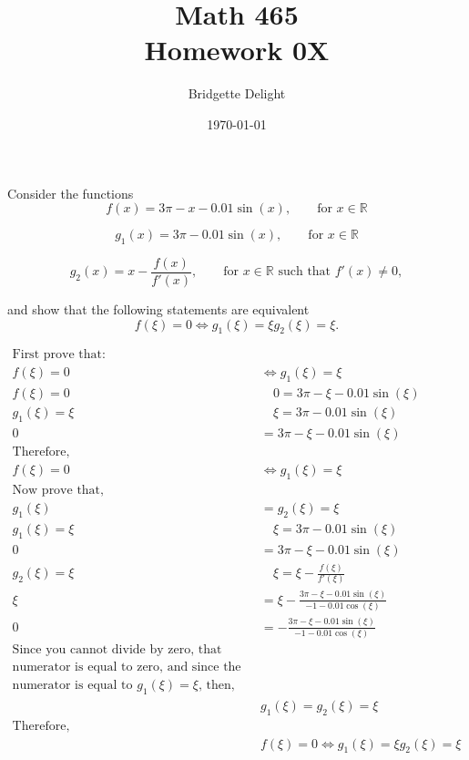 \documentclass{article}
\title{{\large Math 465}\\ Homework 0X}
\author{Bridgette Delight}
\date{\today}
\begin{document}

\section{}
Consider the functions
\begin{equation}\label{eq:1a}
    f(x) = 3\pi - x - 0.01 \sin(x), \qquad \text{for }x \in \mathbb{R}
\end{equation}

\begin{equation}\label{eq:1b}
    g_1(x) = 3\pi - 0.01 \sin(x), \qquad \text{for }x \in \mathbb{R}
\end{equation}

\begin{equation}\label{eq:1c}
    g_2(x) =  x - \frac{f(x)}{f'(x)}, \qquad \text{for }x \in \mathbb{R} \text{ such that }f'(x) \ne 0,
\end{equation}

and show that the following statements are equivalent
$$f(\xi) = 0 \Longleftrightarrow g_1(\xi)=\xi g_2(\xi) = \xi.$$

\vspace{10mm}

\begin{align*}
    \text{First prove that:}&\\
    f(\xi) =0 & \Longleftrightarrow g_1(\xi)=\xi\\
    f(\xi) =0 &\quad 0 = 3\pi - \xi - 0.01\sin(\xi)\\
    g_1(\xi)=\xi & \quad \xi = 3\pi - 0.01\sin(\xi)\\
    0 &= 3\pi - \xi - 0.01\sin(\xi)\\
    \text{Therefore,}&\\
    f(\xi) =0 & \Longleftrightarrow g_1(\xi)=\xi\\
    \text{Now prove that,}&\\
     g_1(\xi)&= g_2(\xi) = \xi\\
     g_1(\xi)=\xi & \quad \xi = 3\pi - 0.01\sin(\xi)\\
     0 &= 3\pi - \xi - 0.01\sin(\xi)\\
     g_2(\xi)=\xi & \quad \xi= \xi - \frac{f(\xi)}{f'(\xi)}\\
     \xi &= \xi - \frac{3\pi - \xi - 0.01\sin(\xi)}{-1-0.01\cos(\xi)}\\
     0 &= - \frac{3\pi - \xi - 0.01\sin(\xi)}{-1-0.01\cos(\xi)}\\
     \text{Since you cannot divide by zero, that means the}&\\
     \text{numerator is equal to zero, and since the }&\\
     \text{numerator is equal to $g_1(\xi)=\xi$, then,}\\
     &g_1(\xi) = g_2(\xi) = \xi \\
    \text{Therefore,}&\\
    &f(\xi) = 0 \Longleftrightarrow g_1(\xi)=\xi g_2(\xi) = \xi
\end{align*}
\end{document}
